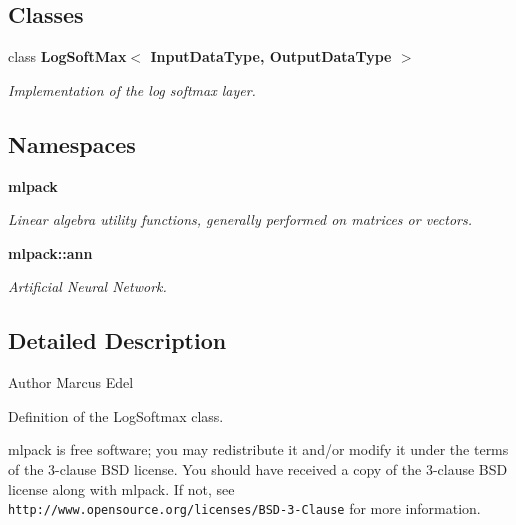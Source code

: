 \subsection*{Classes}
\begin{DoxyCompactItemize}
\item 
class \textbf{ Log\+Soft\+Max$<$ Input\+Data\+Type, Output\+Data\+Type $>$}
\begin{DoxyCompactList}\small\item\em Implementation of the log softmax layer. \end{DoxyCompactList}\end{DoxyCompactItemize}
\subsection*{Namespaces}
\begin{DoxyCompactItemize}
\item 
 \textbf{ mlpack}
\begin{DoxyCompactList}\small\item\em Linear algebra utility functions, generally performed on matrices or vectors. \end{DoxyCompactList}\item 
 \textbf{ mlpack\+::ann}
\begin{DoxyCompactList}\small\item\em Artificial Neural Network. \end{DoxyCompactList}\end{DoxyCompactItemize}


\subsection{Detailed Description}
\begin{DoxyAuthor}{Author}
Marcus Edel
\end{DoxyAuthor}
Definition of the Log\+Softmax class.

mlpack is free software; you may redistribute it and/or modify it under the terms of the 3-\/clause B\+SD license. You should have received a copy of the 3-\/clause B\+SD license along with mlpack. If not, see {\tt http\+://www.\+opensource.\+org/licenses/\+B\+S\+D-\/3-\/\+Clause} for more information. 
